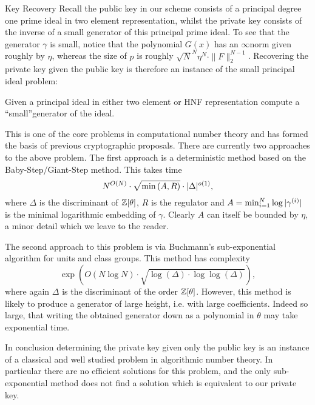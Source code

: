\begin{bparagraph}{Key Recovery}
	Recall the public key in our scheme consists of a principal degree one prime ideal in two element representation, whilst the private key consists of the inverse of a small generator of this principal prime ideal. 
	To see that the generator $\gamma$ is small, notice that the polynomial $G(x)$ has an $\infty$\ndash norm given roughly by $\eta$, whereas the size of $p$ is roughly $\sqrt{N}^N \eta ^ N \cdot \| F \|^{N-1}_2$. 
	Recovering the private key given the public key is therefore an instance of the small principal ideal problem:
	
	\begin{definition}
		Given a principal ideal  in either two element or HNF representation compute a \textquotedblleft small\textquotedblright generator of the ideal.
	\end{definition}
	
	This is one of the core problems in computational number theory and has formed the basis of previous cryptographic proposals. There are currently two approaches to the above problem.
	The first approach is a deterministic method based on the Baby-Step/Giant-Step method.
	This takes time
	\[
	N^{O(N)} \cdot \sqrt{\min{(A, R)}} \cdot \arrowvert\Delta \arrowvert^{o(1)},
	\]
	where $\Delta$ is the discriminant of $\mathbb{Z}[\theta]$, $R$ is the regulator and $A = \min^{N}_{i=1} \log{\arrowvert \gamma^{(i)} \arrowvert}$ is the minimal logarithmic embedding of $\gamma$. 
	Clearly $A$ can itself be bounded by $\eta$, a minor detail which we leave to the reader.
	
	The second approach to this problem is via Buchmann's sub-exponential algorithm for units and class groups.
	This method has complexity
	\[
	\exp{\left( O(N \log N) \cdot \sqrt{\log{(\Delta)} \cdot \log{\log{(\Delta)}}} \right)},
	\]
	where again $\Delta$ is the discriminant of the order $\mathbb{Z}[\theta]$.
	However, this method is	likely to produce a generator of large height, i.e. with large coefficients.
	Indeed so large, that writing the obtained generator down as a polynomial in $\theta$ may take exponential time.
	
	In conclusion determining the private key given only the public key is an instance of a classical and well studied problem in algorithmic number theory.
	In particular there are no efficient solutions for this problem, and the only sub-exponential method does not find a solution which is equivalent to our private key.
	
\end{bparagraph}

